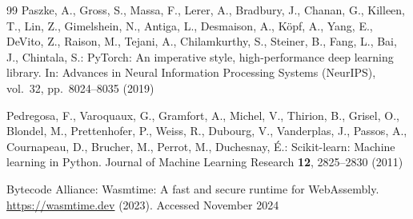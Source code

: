 \documentclass[iicol,Numbered]{sn-jnl}
\begin{document}
\begin{thebibliography}{99}
Paszke, A., Gross, S., Massa, F., Lerer, A., Bradbury, J., Chanan, G.,
Killeen, T., Lin, Z., Gimelshein, N., Antiga, L., Desmaison, A.,
K{\"o}pf, A., Yang, E., DeVito, Z., Raison, M., Tejani, A.,
Chilamkurthy, S., Steiner, B., Fang, L., Bai, J., Chintala, S.:
PyTorch: An imperative style, high-performance deep learning library.
In: Advances in Neural Information Processing Systems (NeurIPS), vol.\ 32,
pp.\ 8024--8035 (2019)

Pedregosa, F., Varoquaux, G., Gramfort, A., Michel, V., Thirion, B.,
Grisel, O., Blondel, M., Prettenhofer, P., Weiss, R., Dubourg, V.,
Vanderplas, J., Passos, A., Cournapeau, D., Brucher, M., Perrot, M.,
Duchesnay, {\'E}.:
Scikit-learn: Machine learning in Python.
Journal of Machine Learning Research \textbf{12}, 2825--2830 (2011)

Bytecode Alliance:
Wasmtime: A fast and secure runtime for WebAssembly.
\url{https://wasmtime.dev} (2023). Accessed November 2024

\end{thebibliography}
\endgroup
\end{document}
